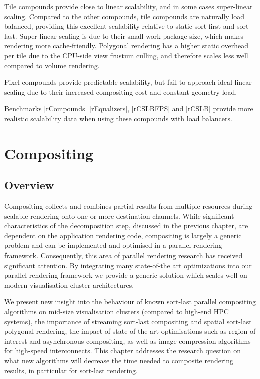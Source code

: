 Tile compounds provide close to linear scalability, and in some cases
super-linear scaling. Compared to the other compounds, tile compounds are
naturally load balanced, providing this excellent scalability relative to
static sort-first and sort-last. Super-linear scaling is due to their small
work package size, which makes rendering more cache-friendly. Polygonal
rendering has a higher static overhead per tile due to the CPU-side view
frustum culling, and therefore scales less well compared to volume rendering.

Pixel compounds provide predictable scalability, but fail to approach ideal
linear scaling due to their increased compositing cost and constant geometry
load.

Benchmarks \ref{rCompounds} \ref{rEqualizers}, \ref{rCSLBFPS} and \ref{rCSLB}
provide more realistic scalability data when using these compounds with load
balancers.

\chapter{Compositing}\label{sCompositing}

\section{Overview}

Compositing collects and combines partial results from multiple resources
during scalable rendering onto one or more destination channels. While
significant characteristics of the decomposition step, discussed in the
previous chapter, are dependent on the application rendering code, compositing
is largely a generic problem and can be implemented and optimised in a parallel
rendering framework. Consequently, this area of parallel rendering research has
received significant attention. By integrating many state-of-the art
optimizations into our parallel rendering framework we provide a generic
solution which scales well on modern visualisation cluster architectures.

We present new insight into the behaviour of known sort-last parallel
compositing algorithms on mid-size visualisation clusters (compared to high-end
HPC systems), the importance of streaming sort-last compositing and spatial
sort-last polygonal rendering, the impact of state of the art optimisations
such as region of interest and asynchronous compositing, as well as image
compression algorithms for high-speed interconnects. This chapter addresses the
research question on what new algorithms will decrease the time needed to
composite rendering results, in particular for sort-last rendering.

